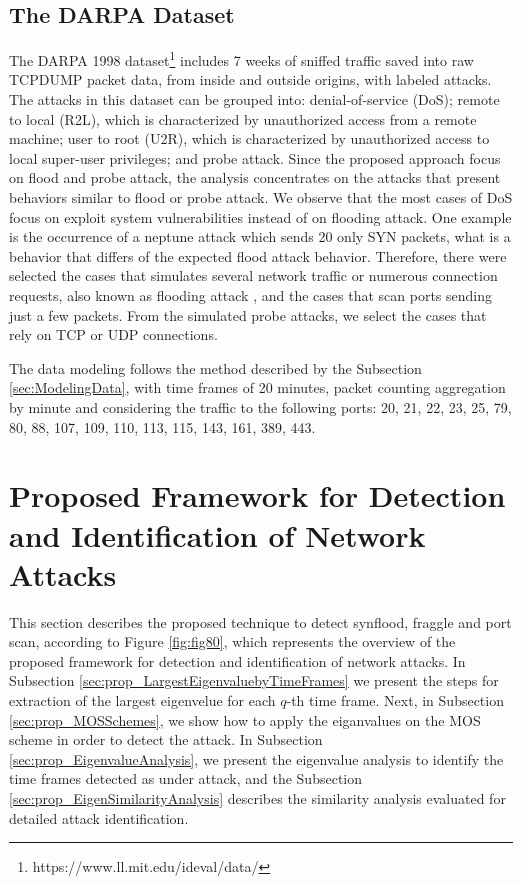 \documentclass[review]{elsarticle}
\begin{document}
\subsection{The DARPA Dataset}
\label{sec:DarpaDataset}

The DARPA 1998 dataset\footnote{https://www.ll.mit.edu/ideval/data/} includes 7 weeks of sniffed traffic saved into raw TCPDUMP packet data, from inside and outside origins, with labeled attacks. The attacks in this dataset
can be grouped into: denial-of-service (DoS); remote to local (R2L), which is characterized by unauthorized access from a
remote machine; user to root (U2R), which is characterized by unauthorized access to local
super-user privileges; and probe attack. Since the proposed approach focus on flood and probe attack, the analysis concentrates on the attacks that present behaviors similar to flood or probe attack. We observe that the most cases of DoS focus on exploit system vulnerabilities instead of on flooding attack. One example is the occurrence of a neptune attack which sends 20 only SYN packets, what is a behavior that differs of the expected flood attack behavior. Therefore, there were selected the cases that simulates several network traffic or numerous connection requests, also known as flooding attack \cite{ahmed2016survey,osanaiye2016distributed}, and the cases that scan ports sending just a few packets. From the simulated probe attacks, we select the cases that rely on TCP or UDP connections.

The data modeling follows the method described by the Subsection \ref{sec:ModelingData}, with time frames of 20 minutes, packet counting aggregation by minute and considering the traffic to the following ports: 20, 21, 22, 23, 25, 79, 80, 88, 107, 109, 110, 113, 115, 143, 161, 389, 443.


\section{Proposed Framework for Detection and Identification of Network Attacks}
\label{sec:prop_getv}

This section describes the proposed technique to detect synflood, fraggle and port scan, according to Figure \ref{fig:fig80}, which represents the overview of the proposed framework for detection and identification of network attacks. In Subsection \ref{sec:prop_LargestEigenvaluebyTimeFrames} we present the steps for extraction of the largest eigenvelue for each $q$-th time frame. Next, in Subsection \ref{sec:prop_MOSSchemes}, we show how to apply the eiganvalues on the MOS scheme in order to detect the attack. In Subsection \ref{sec:prop_EigenvalueAnalysis}, we present the eigenvalue analysis to identify the time frames detected as under attack, and the Subsection \ref{sec:prop_EigenSimilarityAnalysis} describes the similarity analysis evaluated for detailed attack identification.
\end{document}
